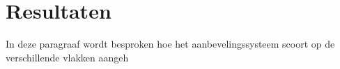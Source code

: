 \section{Resultaten}
In deze paragraaf wordt besproken hoe het aanbevelingssysteem scoort op de verschillende vlakken aangeh